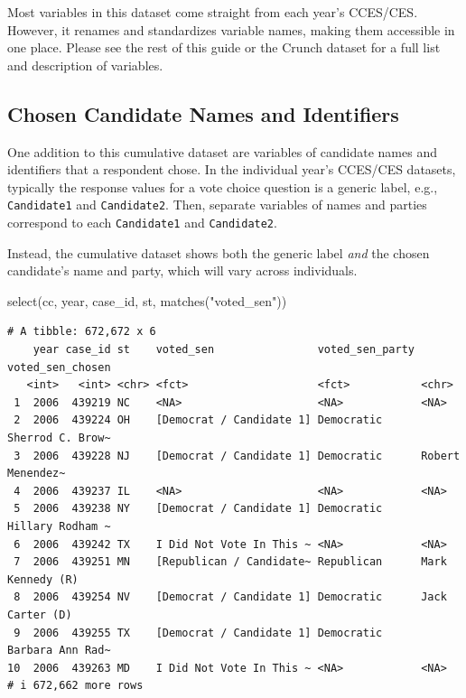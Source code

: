 \documentclass[10pt,article,oneside]{memoir}
\theoremstyle{definition}
\newenvironment{Shaded}{\begin{snugshade}}{\end{snugshade}}
\newcommand{\FunctionTok}[1]{\textcolor[rgb]{0.28,0.35,0.67}{#1}}
\newcommand{\NormalTok}[1]{\textcolor[rgb]{0.00,0.23,0.31}{#1}}
\newcommand{\StringTok}[1]{\textcolor[rgb]{0.13,0.47,0.30}{#1}}
\begin{document}
Most variables in this dataset come straight from each year's CCES/CES.
However, it renames and standardizes variable names, making them
accessible in one place. Please see the rest of this guide or the Crunch
dataset for a full list and description of variables.

\subsection{Chosen Candidate Names and
Identifiers}\label{chosen-candidate-names-and-identifiers}

One addition to this cumulative dataset are variables of candidate names
and identifiers that a respondent chose. In the individual year's
CCES/CES datasets, typically the response values for a vote choice
question is a generic label, e.g., \texttt{Candidate1} and
\texttt{Candidate2}. Then, separate variables of names and parties
correspond to each \texttt{Candidate1} and \texttt{Candidate2}.

Instead, the cumulative dataset shows both the generic label \emph{and}
the chosen candidate's name and party, which will vary across
individuals.

\begin{Shaded}
\begin{Highlighting}[]
\FunctionTok{select}\NormalTok{(cc, year, case\_id, st, }\FunctionTok{matches}\NormalTok{(}\StringTok{"voted\_sen"}\NormalTok{))}
\end{Highlighting}
\end{Shaded}

\begin{verbatim}
# A tibble: 672,672 x 6
    year case_id st    voted_sen                voted_sen_party voted_sen_chosen
   <int>   <int> <chr> <fct>                    <fct>           <chr>           
 1  2006  439219 NC    <NA>                     <NA>            <NA>            
 2  2006  439224 OH    [Democrat / Candidate 1] Democratic      Sherrod C. Brow~
 3  2006  439228 NJ    [Democrat / Candidate 1] Democratic      Robert Menendez~
 4  2006  439237 IL    <NA>                     <NA>            <NA>            
 5  2006  439238 NY    [Democrat / Candidate 1] Democratic      Hillary Rodham ~
 6  2006  439242 TX    I Did Not Vote In This ~ <NA>            <NA>            
 7  2006  439251 MN    [Republican / Candidate~ Republican      Mark Kennedy (R)
 8  2006  439254 NV    [Democrat / Candidate 1] Democratic      Jack Carter (D) 
 9  2006  439255 TX    [Democrat / Candidate 1] Democratic      Barbara Ann Rad~
10  2006  439263 MD    I Did Not Vote In This ~ <NA>            <NA>            
# i 672,662 more rows
\end{verbatim}
\end{document}
